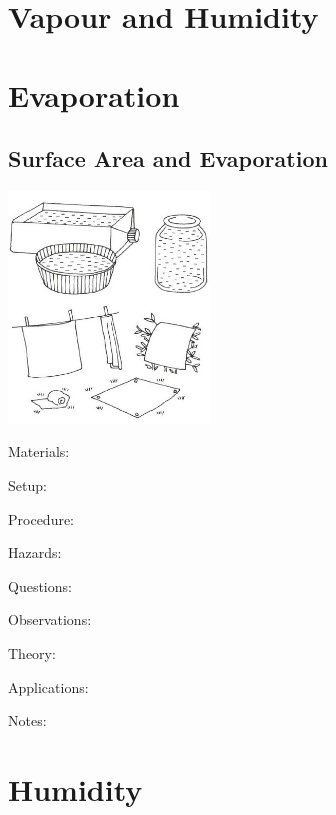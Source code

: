 \section{Vapour and Humidity}

\begin{multicols}{2}


\section*{Evaporation}


\subsection{Surface Area and Evaporation}

\begin{center}
\includegraphics[width=0.4\textwidth]{./img/vso/sa-evaporation.png}
\end{center}

\begin{description*}
\item[Materials:]{}
\item[Setup:]{}
\item[Procedure:]{}
\item[Hazards:]{}
\item[Questions:]{}
\item[Observations:]{}
\item[Theory:]{}
\item[Applications:]{}
\item[Notes:]{}
\end{description*}


\section*{Humidity}



\end{multicols}
